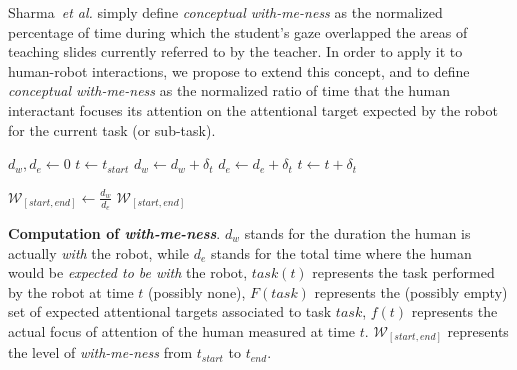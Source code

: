 \documentclass{sig-alternate}
\newcommand{\etal}{\textit{et al.}\xspace}
\begin{document}
Sharma~\etal simply define \emph{conceptual with-me-ness} as the normalized
percentage of time during which the student's gaze overlapped the areas of
teaching slides currently referred to by the teacher.  In order to apply it to
human-robot interactions, we propose to extend this concept, and to define
\emph{conceptual with-me-ness} as the normalized ratio of time that the human
interactant focuses its attention on the attentional target expected by the
robot for the current task (or sub-task).


\begin{algorithm}[h!]
    \centering

    \begin{algorithmic}[1]
     {}
    \State $d_w, d_e \gets 0$
    \State $t \gets t_{start}$
    \Repeat
     \label{algline:skiplosttrack}
            \State $d_w \gets d_w + \delta_t$
        \EndIf
        \State $d_e \gets d_e + \delta_t$
    \EndIf
    \State $t \gets t + \delta_t$

    \State $\mathcal{W}_{[start, end]} \gets \frac{d_w}{d_e}$
    \State \Return $\mathcal{W}_{[start, end]}$
    \EndProcedure

    \end{algorithmic}

    \caption{\textbf{Computation of \emph{with-me-ness}}. $d_w$ stands for the duration
        the human is actually \emph{with} the robot, while $d_e$ stands for the
        total time where the human would be \emph{expected to be with} the robot, $task(t)$
        represents the task performed by the robot at time $t$ (possibly none),
        $F(task)$ represents the (possibly empty) set of expected attentional
        targets associated to task $task$, $f(t)$ represents the actual focus of
        attention of the human measured at time $t$. $\mathcal{W}_{[start, end]}$ represents
        the level of \emph{with-me-ness} from $t_{start}$ to $t_{end}$.}
    \label{alg:with-me-ness}
\end{algorithm}
\end{document}

